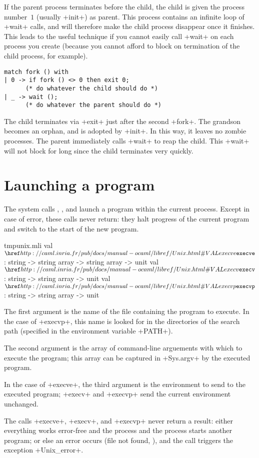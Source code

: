 If the parent process terminates before the child, the child is
given the process number~$1$ (usually \ml+init+) as parent. This
process contains an infinite loop of \ml+wait+ calls, and will
therefore make the child process disappear once it finishes. This
leads to the useful  technique if you cannot
easily call \ml+wait+ on each process you create (because you cannot
afford to block on termination of the child process,
for example).
%
\begin{lstlisting}
match fork () with
| 0 -> if fork () <> 0 then exit 0;
      (* do whatever the child should do *)
| _ -> wait ();
      (* do whatever the parent should do *)
\end{lstlisting}
%
The child terminates via \ml+exit+ just after the second \ml+fork+.
The grandson becomes an orphan, and is adopted by \ml+init+.  In this
way, it leaves no zombie processes. The parent immediately calls
\ml+wait+ to reap the child. This \ml+wait+ will not block for long
since the child terminates very quickly.

\section{Launching a program}

The system calls , , and
 launch a program within the current process.
Except in case of error, these calls never return: they halt progress
of the current program and switch to the start of the new program.
%
\begin{listingcodefile}{tmpunix.mli}
val $\libvalue{Unix}{execve}$ : string -> string array -> string array -> unit
val $\libvalue{Unix}{execv}$  : string -> string array -> unit
val $\libvalue{Unix}{execvp}$ : string -> string array -> unit
\end{listingcodefile}
%
The first argument is the name of the file containing the program to
execute. In the case of \ml+execvp+, this name is looked for in the
directories of the search path (specified in the environment variable
\ml+PATH+).

The second argument is the array of command-line arguements with which
to execute the program; this array can be captured in \ml+Sys.argv+ by
the executed program.

In the case of \ml+execve+, the third argument is the environment
to send to the executed program; \ml+execv+ and \ml+execvp+
send the current environment unchanged.

The calls \ml+execve+, \ml+execv+, and \ml+execvp+ never return a
result: either everything works error-free and the process and the
process starts another program; or else an error occurs (file not
found, \etc), and the call triggers the exception \ml+Unix_error+.


